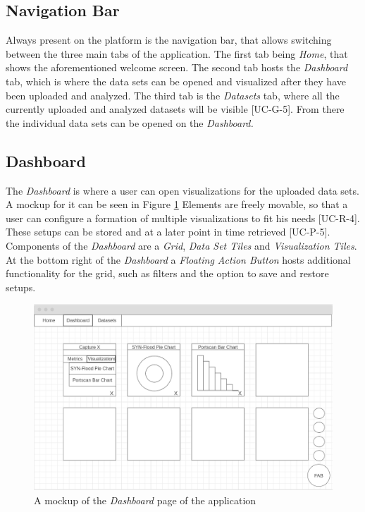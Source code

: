 \subsection{Navigation Bar}
Always present on the platform is the navigation bar, that allows switching between the three main tabs of the application. The first tab being \emph{Home}, that shows the aforementioned welcome screen. The second tab hosts the \emph{Dashboard} tab, which is where the data sets can be opened and visualized after they have been uploaded and analyzed. The third tab is the \emph{Datasets} tab, where all the currently uploaded and analyzed datasets will be visible [UC-G-5]. From there the individual data sets can be opened on the \emph{Dashboard.}

\subsection{Dashboard}
The \emph{Dashboard} is where a user can open visualizations for the uploaded data sets. A mockup for it can be seen in Figure \ref{fig:dashboardmockup}  Elements are freely movable, so that a user can configure a formation of multiple visualizations to fit his needs [UC-R-4]. These setups can be stored and at a later point in time retrieved [UC-P-5]. Components of the \emph{Dashboard} are a \emph{Grid}, \emph{Data Set Tiles} and \emph{Visualization Tiles}. At the bottom right of the \emph{Dashboard} a \emph{Floating Action Button} hosts additional functionality for the grid, such as filters and the option to save and restore setups.

\begin{figure}
    \centering
    \includegraphics[width=16cm]{images/dashboard_mockup.png}
    \caption{A mockup of the \emph{Dashboard} page of the application}
    \label{fig:dashboardmockup}
\end{figure}

